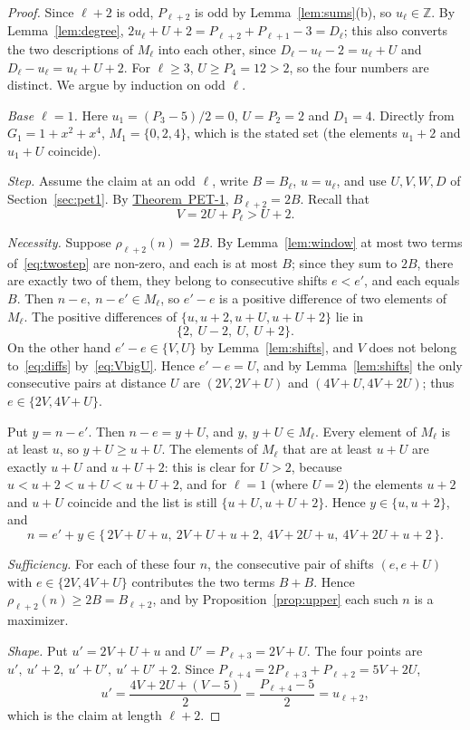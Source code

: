 \documentclass[11pt]{amsart}
\theoremstyle{definition}
\theoremstyle{remark}
\theoremstyle{plain}
\numberwithin{equation}{section}
\newcommand{\Z}{\mathbb{Z}}
\newcommand{\PETone}{\hyperref[thm:pet1]{Theorem~PET-1}}
\begin{document}
\begin{proof}
Since $\ell+2$ is odd, $P_{\ell+2}$ is odd by Lemma~\ref{lem:sums}(b), so $u_\ell\in\Z$. By
Lemma~\ref{lem:degree}, $2u_\ell+U+2=P_{\ell+2}+P_{\ell+1}-3=D_\ell$; this also converts the two
descriptions of $M_\ell$ into each other, since $D_\ell-u_\ell-2=u_\ell+U$ and
$D_\ell-u_\ell=u_\ell+U+2$. For $\ell\ge3$, $U\ge P_4=12>2$, so the four numbers are distinct.
We argue by induction on odd $\ell$.

\emph{Base $\ell=1$.} Here $u_1=(P_3-5)/2=0$, $U=P_2=2$ and $D_1=4$. Directly from
$G_1=1+x^2+x^4$, $M_1=\{0,2,4\}$, which is the stated set (the elements $u_1+2$ and $u_1+U$
coincide).

\emph{Step.} Assume the claim at an odd $\ell$, write $B=B_\ell$, $u=u_\ell$, and use $U,V,W,D$ of
Section~\ref{sec:pet1}. By \PETone, $B_{\ell+2}=2B$. Recall that
\begin{equation}\label{eq:VbigU}
V=2U+P_\ell>U+2.
\end{equation}

\emph{Necessity.} Suppose $\rho_{\ell+2}(n)=2B$. By Lemma~\ref{lem:window} at most two terms
of~\eqref{eq:twostep} are non-zero, and each is at most $B$; since they sum to $2B$, there are
exactly two of them, they belong to consecutive shifts $e<e'$, and each equals $B$. Then
$n-e,\ n-e'\in M_\ell$, so $e'-e$ is a positive difference of two elements of $M_\ell$. The positive
differences of $\{u,u+2,u+U,u+U+2\}$ lie in
\begin{equation}\label{eq:diffs}
\{2,\ U-2,\ U,\ U+2\}.
\end{equation}
On the other hand $e'-e\in\{V,U\}$ by Lemma~\ref{lem:shifts}, and $V$ does not belong
to~\eqref{eq:diffs} by~\eqref{eq:VbigU}. Hence $e'-e=U$, and by Lemma~\ref{lem:shifts} the only
consecutive pairs at distance $U$ are $(2V,2V+U)$ and $(4V+U,4V+2U)$; thus $e\in\{2V,4V+U\}$.

Put $y=n-e'$. Then $n-e=y+U$, and $y,\ y+U\in M_\ell$. Every element of $M_\ell$ is at least $u$,
so $y+U\ge u+U$. The elements of $M_\ell$ that are at least $u+U$ are exactly $u+U$ and $u+U+2$:
this is clear for $U>2$, because $u<u+2<u+U<u+U+2$, and for $\ell=1$ (where $U=2$) the elements
$u+2$ and $u+U$ coincide and the list is still $\{u+U,u+U+2\}$. Hence $y\in\{u,u+2\}$, and
\[
n=e'+y\in\{\,2V+U+u,\ 2V+U+u+2,\ 4V+2U+u,\ 4V+2U+u+2\,\}.
\]

\emph{Sufficiency.} For each of these four $n$, the consecutive pair of shifts $(e,e+U)$ with
$e\in\{2V,4V+U\}$ contributes the two terms $B+B$. Hence $\rho_{\ell+2}(n)\ge2B=B_{\ell+2}$, and by
Proposition~\ref{prop:upper} each such $n$ is a maximizer.

\emph{Shape.} Put $u'=2V+U+u$ and $U'=P_{\ell+3}=2V+U$. The four points are
$u',\ u'+2,\ u'+U',\ u'+U'+2$. Since $P_{\ell+4}=2P_{\ell+3}+P_{\ell+2}=5V+2U$,
\[
u'=\frac{4V+2U+(V-5)}{2}=\frac{P_{\ell+4}-5}{2}=u_{\ell+2},
\]
which is the claim at length $\ell+2$.
\end{proof}
\end{document}
